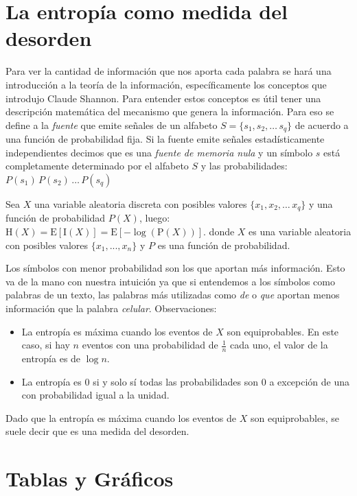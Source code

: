 \section{La entropía como medida del desorden}
\label{sub:entropiaShannon}

Para ver la cantidad de información que nos aporta cada palabra se hará una introducción a la teoría de la información, específicamente
los conceptos que introdujo Claude Shannon\cite{shannon2001mathematical}.
Para entender estos conceptos es útil tener una descripción matemática del mecanismo que genera la información. Para eso se define a 
la \textit{fuente} que emite señales de un alfabeto $ S = \{s_1, s_2, \dots\, s_q\}$ de acuerdo a una función de probabilidad fija.
Si la fuente emite señales estadísticamente independientes decimos que es una \textit{fuente de memoria nula} y un símbolo $s$ está completamente determinado por el alfabeto $S$ y las probabilidades:
$P(s_1)\,P(s_2)\, \dots\, P(s_q)$

Sea $X$ una variable aleatoria discreta con posibles valores $\{x_1, x_2, \dots\, x_q\}$ y una función de probabilidad $P(X)$, luego:
${\displaystyle \mathrm {H} (X)=\mathrm {E} [\mathrm {I} (X)]=\mathrm {E} [-\log(\mathrm {P} (X))].}$
donde $X$ es una variable aleatoria con posibles valores $\{x_1, ... , x_n\}$ y $P$ es una función de probabilidad.

Los símbolos con menor probabilidad son los que aportan más información. Esto va de la mano con nuestra intuición ya que si entendemos a los símbolos como palabras de un texto, las palabras más utilizadas como \textit{de} o \textit{que} aportan menos información que la palabra \textit{celular}. 
Observaciones:
\begin{itemize}
    \item La entropía es máxima cuando los eventos de $X$ son equiprobables. En este caso, si hay $n$ eventos con una probabilidad de $\frac{1}{n}$ cada uno, el valor de la entropía es de $\log n$.
    \item La entropía es 0 si y solo sí todas las probabilidades son 0 a excepción de una con probabilidad igual a la unidad. 
\end{itemize}

Dado que la entropía es máxima cuando los eventos de $X$ son equiprobables, se suele decir que es una medida del desorden.


\section{Tablas y Gráficos}
\label{sub:tablas}

